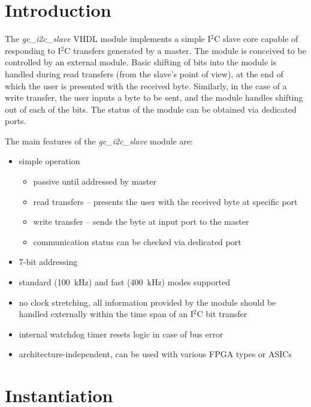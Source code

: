 \documentclass[a4paper,11pt]{article}
\begin{document}
\section{Introduction}
\label{sec:intro}

The \textit{gc\_i2c\_slave} VHDL module implements a simple I$^2$C 
slave core capable of responding to I$^2$C transfers generated by a master. The module 
is conceived to be controlled by an external module. Basic shifting of bits into the 
module is handled during read transfers (from the slave's point of view), at the end of 
which the user is presented with the received byte. Similarly, in the case of a write 
transfer, the user inputs a byte to be sent, and the module handles shifting out of each 
of the bits. The status of the module can be obtained via dedicated ports.

The main features of the \textit{gc\_i2c\_slave} module are:
\begin{itemize}
  \item simple operation
  \begin{itemize}
    \item passive until addressed by master
    \item read transfers -- presents the user with the received byte at specific port
    \item write transfer -- sends the byte at input port to the master
    \item communication status can be checked via dedicated port
  \end{itemize}
  \item 7-bit addressing
  \item standard (100~kHz) and fast (400~kHz) modes supported
  \item no clock stretching, all information provided by the module should be handled
  externally within the time span of an I$^2$C bit transfer
  \item internal watchdog timer resets logic in case of bus error
  \item architecture-independent, can be used with various FPGA types or ASICs
\end{itemize}

\section{Instantiation}
\label{sec:instantiation}
\end{document}
